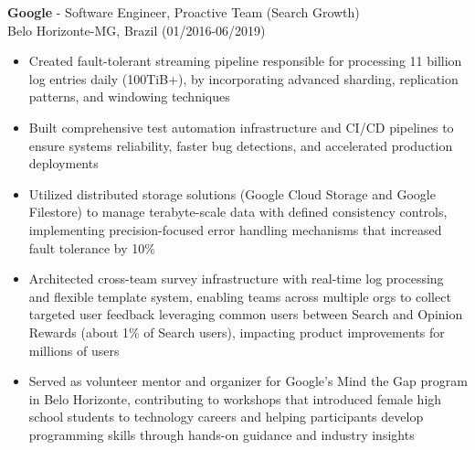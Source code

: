 
\normalsize{\textbf{Google} - \BackEnd{} Software Engineer, Proactive Team (Search Growth)}\\
\footnotesize{Belo Horizonte-MG, Brazil (01/2016-06/2019)}

\begin{itemize}
    \item \small{Created fault-tolerant streaming pipeline responsible for processing 11 billion log entries daily (100TiB+), by incorporating advanced sharding, replication patterns, and windowing techniques}

    \item \small{Built comprehensive test automation infrastructure and CI/CD pipelines to ensure systems reliability, faster bug detections, and accelerated production deployments}

    \item \small{Utilized distributed storage solutions (Google Cloud Storage and Google Filestore) to manage terabyte-scale data with defined consistency controls, implementing precision-focused error handling mechanisms that increased fault tolerance by 10\%}

    \clearpage

    \item \small{Architected cross-team survey infrastructure with real-time log processing and flexible template system, enabling teams across multiple orgs to collect targeted user feedback leveraging common users between Search and Opinion Rewards (about 1\% of Search users), impacting product improvements for millions of users}

    \item \small{Served as volunteer mentor and organizer for Google's Mind the Gap program in Belo Horizonte, contributing to workshops that introduced female high school students to technology careers and helping participants develop programming skills through hands-on guidance and industry insights}
\end{itemize}
